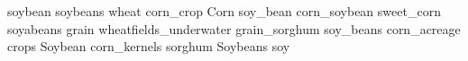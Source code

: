 soybean soybeans wheat corn\_crop Corn soy\_bean corn\_soybean sweet\_corn soyabeans grain wheatfields\_underwater grain\_sorghum soy\_beans corn\_acreage crops Soybean corn\_kernels sorghum Soybeans soy 
